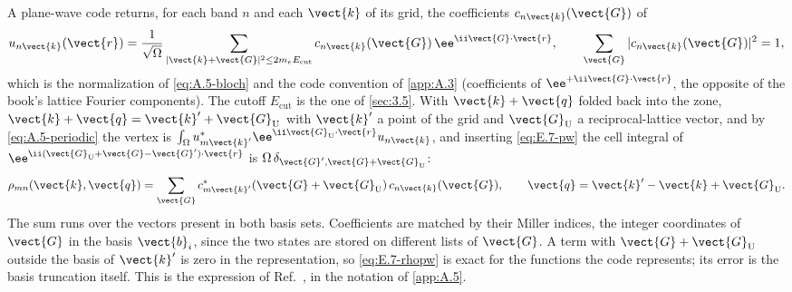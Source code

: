 A plane-wave code returns, for each band $n$ and each $\vect{k}$ of its grid, the coefficients $c_{n\vect{k}}(\vect{G})$ of
\begin{equation}
  u_{n\vect{k}}(\vect{r}) = \frac{1}{\sqrt\Omega}\sum_{|\vect{k}+\vect{G}|^2\le 2m_eE_{\mathrm{cut}}} c_{n\vect{k}}(\vect{G})\,\ee^{\ii\vect{G}\cdot\vect{r}}, \qquad \sum_{\vect{G}}|c_{n\vect{k}}(\vect{G})|^2 = 1 ,
  \label{eq:E.7-pw}
\end{equation}
which is the normalization of \cref{eq:A.5-bloch} and the code convention of \cref{app:A.3} (coefficients of $\ee^{+\ii\vect{G}\cdot\vect{r}}$, the opposite of the book's lattice Fourier components). The cutoff $E_{\mathrm{cut}}$ is the one of \cref{sec:3.5}. With $\vect{k}+\vect{q}$ folded back into the zone, $\vect{k}+\vect{q} = \vect{k}' + \vect{G}_{\mathrm{U}}$ with $\vect{k}'$ a point of the grid and $\vect{G}_{\mathrm{U}}$ a reciprocal-lattice vector, and by \cref{eq:A.5-periodic} the vertex is $\int_\Omega u^*_{m\vect{k}'}\ee^{\ii\vect{G}_{\mathrm{U}}\cdot\vect{r}}u_{n\vect{k}}$, and inserting \cref{eq:E.7-pw} the cell integral of $\ee^{\ii(\vect{G}_{\mathrm{U}} + \vect{G} - \vect{G}')\cdot\vect{r}}$ is $\Omega\,\delta_{\vect{G}',\vect{G}+\vect{G}_{\mathrm{U}}}$:
\begin{equation}
  \rho_{mn}(\vect{k},\vect{q}) = \sum_{\vect{G}} c^*_{m\vect{k}'}(\vect{G} + \vect{G}_{\mathrm{U}})\,c_{n\vect{k}}(\vect{G}), \qquad \vect{q} = \vect{k}' - \vect{k} + \vect{G}_{\mathrm{U}} .
  \label{eq:E.7-rhopw}
\end{equation}
The sum runs over the vectors present in both basis sets. Coefficients are matched by their Miller indices, the integer coordinates of $\vect{G}$ in the basis $\vect{b}_i$, since the two states are stored on different lists of $\vect{G}$. A term with $\vect{G}+\vect{G}_{\mathrm{U}}$ outside the basis of $\vect{k}'$ is zero in the representation, so \cref{eq:E.7-rhopw} is exact for the functions the code represents; its error is the basis truncation itself. This is the expression of Ref.~\cite[Eq.~(3.16)]{essig2016direct}, in the notation of \cref{app:A.5}.

